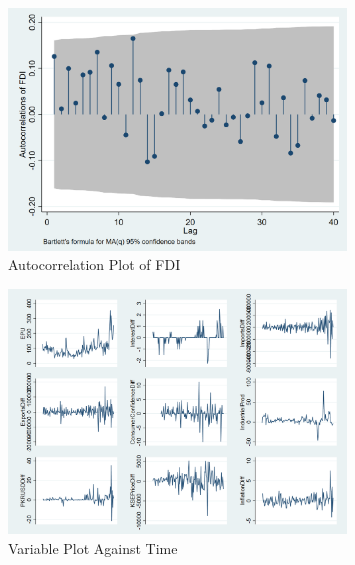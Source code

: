 \documentclass[11pt]{article}
\begin{document}
\begin{figure}[h]
\centering
\includegraphics[width=0.8\textwidth]{images/Figure1b.png}
\caption{Autocorrelation Plot of FDI}
\end{figure}

\begin{figure}[h]
\centering
\includegraphics[width=0.8\textwidth]{images/Figure2.png}
\caption{Variable Plot Against Time}
\end{figure}
\end{document}
